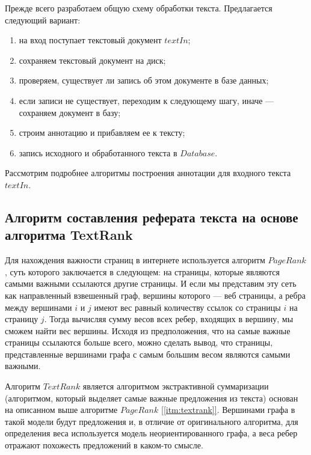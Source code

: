 Прежде всего разработаем общую схему обработки текста. Предлагается следующий вариант:

\begin{enumerate}
    \item на вход поступает текстовый документ $textIn$;
    \item сохраняем текстовый документ на диск;
    \item проверяем, существует ли запись об этом документе в базе данных;
    \item если записи не существует, переходим к следующему шагу, иначе --- сохраняем документ в базу;
    \item строим аннотацию и прибавляем ее к тексту;
    \item запись исходного и обработанного текста в $Database$.
\end{enumerate}

Рассмотрим подробнее алгоритмы построения аннотации для входного текста $textIn$. 

\subsection{Алгоритм составления реферата текста на основе алгоритма TextRank}\label{sec:textrank}

Для нахождения важности страниц в интернете используется алгоритм $PageRank$, суть которого заключается в следующем: на страницы, которые являются самыми важными ссылаются другие страницы. И если мы представим эту сеть как направленный взвешенный граф, вершины которого --- веб страницы, а ребра между вершинами $i$ и $j$ имеют вес равный количеству ссылок со страницы $i$ на страницу $j$. Тогда вычисляя сумму весов всех ребер, входящих в вершину, мы сможем найти вес вершины. Исходя из предположения, что на самые важные страницы ссылаются больше всего, можно сделать вывод, что страницы, представленные вершинами графа с самым большим весом являются самыми важными.

Алгоритм $TextRank$ является алгоритмом экстрактивной суммаризации (алгоритмом, который выделяет самые важные предложения из текста) основан на описанном выше алгоритме $PageRank$ \hyperref[itm:textrank]{[\ref{itm:textrank}]}. Вершинами графа в такой модели будут предложения и, в отличие от оригинального алгоритма, для определения веса используется модель неориентированного графа, а веса ребер отражают похожесть предложений в каком-то смысле.

